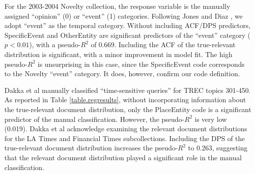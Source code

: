 \documentclass{sig-alternate}
\begin{document}
\begin{table}
\small
{}
\caption{Logistic regression models for each test collection without and with (Rel) ACF/DPS predictors. Model fit reported based pseudo-$R^2$ after stepwise variable selection based on AIC. Variable significance indicated by $p < 0.05 (^\circ),  < 0.01 (^\vartriangle),  < 0.001 (^\blacktriangle)$ }
\label{table.regresults}
\end{table}

For the 2003-2004 Novelty collection, the response variable is the manually assigned ``opinion'' (0) or ``event'' (1) categories.  Following Jones and Diaz \cite{Jones2007}, we adopt ``event'' as the temporal category.   Without including ACF/DPS predictors, SpecificEvent and OtherEntity are significant predictors of the ``event'' category ($p < 0.01$), with a pseudo-$R^2$ of 0.669. Including the ACF of the true-relevant distribution is significant, with a minor improvement in model fit. The high pseudo-$R^2$ is unsurprising in this case, since the SpecificEvent code corresponds to the Novelty ``event'' category. It does, however, confirm our code definition.

Dakka et al \cite{Dakka2012} manually classified ``time-sensitive queries'' for TREC topics 301-450. As reported in Table \ref{table.regresults}, without incorporating information about the true-relevant document distribution, only the PlaceEntity code is a significant predictor of the manual classification. However, the pseudo-$R^2$ is very low (0.019).  Dakka et al acknowledge examining the relevant document distributions for the LA Times and Financial Times subcollections.  Including the DPS of the true-relevant document distribution increases the pseudo-$R^2$ to 0.263, suggesting that the relevant document distribution played a significant role in the manual classification.
\end{document}
